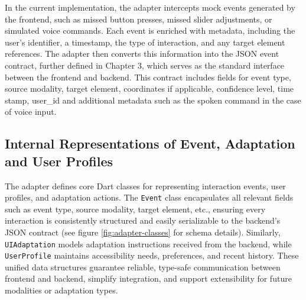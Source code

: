 \documentclass[openany]{book}
\begin{document}
In the current implementation, the adapter intercepts mock events generated by the frontend, such as missed button presses, missed slider adjustments, or simulated voice commands. Each event is enriched with metadata, including the user’s identifier, a timestamp, the type of interaction, and any target element references. The adapter then converts this information into the JSON event contract, further defined in Chapter 3, which serves as the standard interface between the frontend and backend. This contract includes fields for event type, source modality, target element, coordinates if applicable, confidence level, time stamp, user\_id and additional metadata such as the spoken command in the case of voice input.

\subsection{Internal Representations of Event, Adaptation and User Profiles}
The adapter defines core Dart classes for representing interaction events, user profiles, and adaptation actions. The \texttt{Event} class encapsulates all relevant fields such as event type, source modality, target element, etc., ensuring every interaction is consistently structured and easily serializable to the backend’s JSON contract (see figure \ref{fig:adapter-classes} for schema details). Similarly, \texttt{UIAdaptation} models adaptation instructions received from the backend, while \texttt{UserProfile} maintains accessibility needs, preferences, and recent history. These unified data structures guarantee reliable, type-safe communication between frontend and backend, simplify integration, and support extensibility for future modalities or adaptation types.
\end{document}
